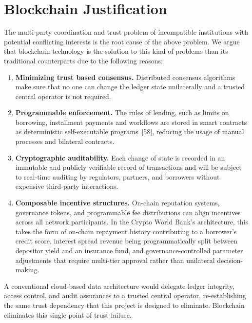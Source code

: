 \documentclass[12pt,a4paper]{report}
\begin{document}
\section{Blockchain Justification}

The multi-party coordination and trust problem of incompatible institutions with potential conflicting interests is the root cause of the above problem. We argue that blockchain technology is the solution to this kind of problems than its traditional counterparts due to the following reasons:

\begin{enumerate}[noitemsep]
\item \textbf{Minimizing trust based consensus.} Distributed consensus algorithms make sure that no one can change the ledger state unilaterally and a trusted central operator is not required.

\item \textbf{Programmable enforcement.} The rules of lending, such as limits on borrowing, installment payments and workflows are stored in smart contracts as deterministic self-executable programs~[58], reducing the usage of manual processes and bilateral contracts.

\item \textbf{Cryptographic auditability.} Each change of state is recorded in an immutable and publicly verifiable record of transactions and will be subject to real-time auditing by regulators, partners, and borrowers without expensive third-party interactions.

\item \textbf{Composable incentive structures.} On-chain reputation systems, governance tokens, and programmable fee distributions can align incentives across all network participants. In the Crypto World Bank's architecture, this takes the form of on-chain repayment history contributing to a borrower's credit score, interest spread revenue being programmatically split between depositor yield and an insurance fund, and governance-controlled parameter adjustments that require multi-tier approval rather than unilateral decision-making.
\end{enumerate}

A conventional cloud-based data architecture would delegate ledger integrity, access control, and audit assurances to a trusted central operator, re-establishing the same trust dependency that this project is designed to eliminate. Blockchain eliminates this single point of trust failure.
\end{document}

